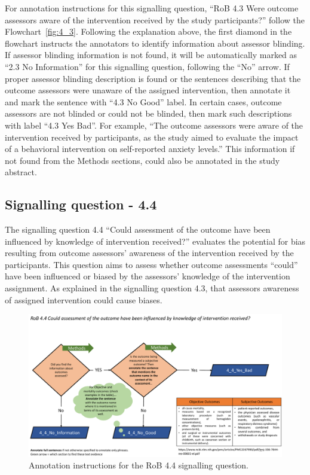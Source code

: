 \documentclass[sn-mathphys,Numbered]{sn-jnl}%
\begin{document}
For annotation instructions for this signalling question, ``RoB 4.3 Were outcome assessors aware of the intervention received by the study participants?'' follow the Flowchart~\ref{fig:4_3}.
Following the explanation above, the first diamond in the flowchart instructs the annotators to identify information about assessor blinding. 
If assessor blinding information is not found, it will be automatically marked as ``2.3 No Information'' for this signalling question, following the  ``No'' arrow.
If proper assessor blinding description is found or the sentences describing that the outcome assessors were unaware of the assigned intervention, then annotate it and mark the sentence with ``4.3 No Good'' label.
In certain cases, outcome assessors are not blinded or could not be blinded, then mark such descriptions with label ``4.3 Yes Bad''.
For example, ``The outcome assessors were aware of the intervention received by participants, as the study aimed to evaluate the impact of a behavioral intervention on self-reported anxiety levels.''
This information if not found from the Methods sections, could also be annotated in the study abstract.

%
%
%
\subsection*{Signalling question - 4.4 }
%
The signalling question 4.4 ``Could assessment of the outcome have been influenced by knowledge of intervention received?'' evaluates the potential for bias resulting from outcome assessors' awareness of the intervention received by the participants.
This question aims to assess whether outcome assessments ``could'' have been influenced or biased by the assessors' knowledge of the intervention assignment.
As explained in the signalling question 4.3, that assessors awareness of assigned intervention could cause biases.

%
%
%
\begin{figure}[hbt]
    \centering
    \includegraphics[width=\textwidth]{figures/4_4.pdf}
    \caption{Annotation instructions for the RoB 4.4 signalling question.}
    \label{fig:4_4}
\end{figure}
\end{document}
